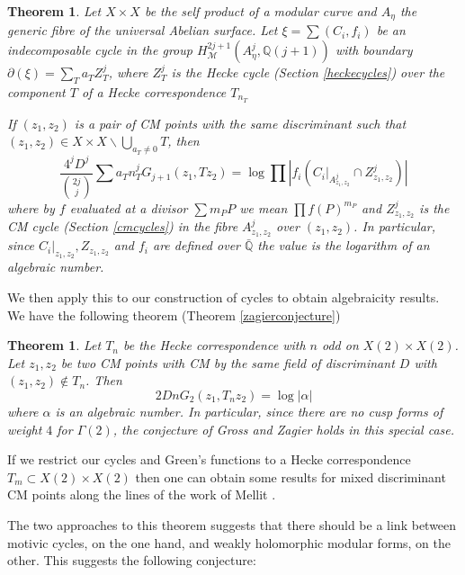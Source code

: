 \documentclass[11pt,a4paper]{article}
\newtheorem{thm}[defn]{Theorem}
\newcommand {\Q}{{\mathds Q}}
\newcommand {\M}{{\mathcal M}}
\begin{document}
\begin{thm}
	\label{alg}
	Let $X \times X$ be the self product of a modular curve and $A_{\eta}$ the generic fibre of the universal Abelian surface. Let $\xi=\sum(C_i,f_i)$ be an indecomposable cycle in the group $H^{2j+1}_{\M}(A^j_{\eta},\Q(j+1))$ with boundary $\partial(\xi)=\sum_T a_T Z^j_T$, where $Z^j_T$ is the Hecke cycle (Section \ref{heckecycles}) over the component $T$ of a Hecke correspondence $T_{n_T}$ 
	
	
	If $(z_1,z_2)$ is a pair of CM points with the {\em same discriminant} such that $(z_1,z_2)\in X \times X\backslash \bigcup_{a_T \neq 0} T$, then  
	$$\frac{4^jD^j}{\binom{2j}{j}}\sum a_T n^j_TG_{j+1}(z_1,T z_2)=\log  \prod \left| f_i(C_i|_{A^j_{z_1,z_2}} \cap Z^j_{z_1,z_2})\right|$$
	where by $f$ evaluated at a divisor $\sum m_P P$ we mean $\prod f(P)^{m_P}$ and $Z^j_{z_1,z_2}$ is the CM cycle (Section \ref{cmcycles}) in the fibre $A^j_{z_1,z_2}$ over $(z_1,z_2)$. In particular, since $C_i|_{z_1,z_2},Z_{z_1,z_2}$ and $f_i$ are defined over $\bar{\Q}$ the value is the logarithm of an algebraic number. 
\end{thm}
%
We then apply this to our construction of cycles to obtain algebraicity results. We have the following theorem (Theorem \ref{zagierconjecture})

\begin{thm}  Let $T_n$ be the Hecke correspondence with $n$ odd on $X(2) \times X(2)$. Let $z_1,z_2$ be two CM points with CM by the same field of discriminant $D$ with $(z_1,z_2)\notin T_n$.	Then 
	$$2DnG_2(z_1,T_nz_2)=\log|\alpha|$$
	where $\alpha$ is an algebraic number. In particular, since there are no cusp forms of weight $4$ for $\Gamma(2)$,  the conjecture of Gross and Zagier holds in this special case. 
\end{thm}


If we restrict our cycles and Green's functions to a Hecke correspondence $T_m \subset X(2) \times X(2)$ then one can obtain some results for mixed discriminant CM points along the lines of the work of Mellit \cite{mell}.




The two approaches to this theorem suggests that there should be a link between motivic cycles, on the one hand, and weakly holomorphic modular forms, on the other. This suggests the following conjecture: 
\end{document}
